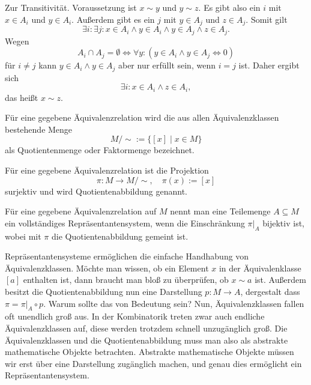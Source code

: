 Zur Transitivität. Voraussetzung ist $x\sim y$ und $y\sim z$.
Es gibt also ein $i$ mit $x\in A_i$ und $y\in A_i$. Außerdem gibt
es ein $j$ mit $y\in A_j$ und $z\in A_j$. Somit gilt%
\[\exists i\colon\exists j\colon x\in A_i\land y\in A_i\land y\in A_j\land z\in A_j.\]
Wegen
\[A_i\cap A_j = \emptyset \iff \forall y\colon (y\in A_i\land y\in A_j\Leftrightarrow 0)\]
für $i\ne j$ kann $y\in A_i\land y\in A_j$ aber nur erfüllt sein,
wenn $i=j$ ist. Daher ergibt sich%
\[\exists i\colon x\in A_i\land z\in A_i,\]
das heißt $x\sim z$.\;\qedsymbol

\begin{Definition}[Quotientenmenge]%
\newlinefirst
Für eine gegebene Äquivalenzrelation wird die aus allen
Äquivalenzklassen bestehende Menge
\[M/{\sim} := \{[x]\mid x\in M\}\]
als Quotientenmenge oder Faktormenge bezeichnet.
\end{Definition}

\begin{Definition}[Quotientenabbildung]%
\newlinefirst
Für eine gegebene Äquivalenzrelation ist die Projektion
\[\pi\colon M\to M/{\sim},\quad \pi(x):=[x]\]
surjektiv und wird Quotientenabbildung genannt.
\end{Definition}

\begin{Definition}[Repräsentantensystem]%
\newlinefirst
Für eine gegebene Äquivalenzrelation auf $M$ nennt man eine
Teilemenge $A\subseteq M$ ein vollständiges Repräsentantensystem,
wenn die Einschränkung $\pi|_A$ bijektiv ist, wobei mit $\pi$
die Quotientenabbildung gemeint ist.
\end{Definition}
Repräsentantensysteme ermöglichen die einfache Handhabung von
Äquivalenzklassen. Möchte man wissen, ob ein Element $x$ in der
Äquivalenklasse $[a]$ enthalten ist, dann braucht man bloß
zu überprüfen, ob $x\sim a$ ist. Außerdem besitzt die
Quotientenabbildung nun eine Darstellung $p\colon M\to A$,
dergestalt dass $\pi = \pi|_{A}\circ p$. Warum sollte das von
Bedeutung sein? Nun, Äquivalenzklassen fallen oft unendlich groß
aus. In der Kombinatorik treten zwar auch endliche Äquivalenzklassen auf,
diese werden trotzdem schnell unzugänglich groß. Die Äquivalenzklassen
und die Quotientenabbildung muss man also als abstrakte mathematische
Objekte betrachten. Abstrakte mathematische Objekte müssen wir erst
über eine Darstellung zugänglich machen, und genau dies ermöglicht
ein Repräsentantensystem.


